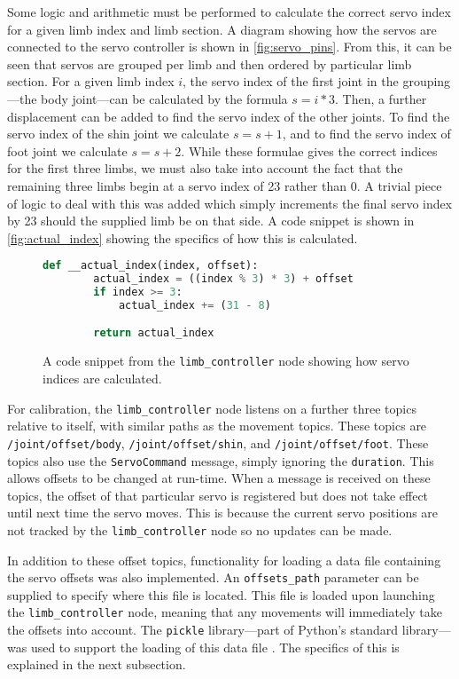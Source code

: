 Some logic and arithmetic must be performed to calculate the correct servo index for a given limb index and limb section. A diagram showing how the servos are connected to the servo controller is shown in \autoref{fig:servo_pins}. From this, it can be seen that servos are grouped per limb and then ordered by particular limb section. For a given limb index $i$, the servo index of the first joint in the grouping---the body joint---can be calculated by the formula $s = i * 3$. Then, a further displacement can be added to find the servo index of the other joints. To find the servo index of the shin joint we calculate $s = s + 1$, and to find the servo index of foot joint we calculate $s = s + 2$. While these formulae gives the correct indices for the first three limbs, we must also take into account the fact that the remaining three limbs begin at a servo index of 23 rather than 0. A trivial piece of logic to deal with this was added which simply increments the final servo index by 23 should the supplied limb be on that side. A code snippet is shown in \autoref{fig:actual_index} showing the specifics of how this is calculated.

\begin{figure}[!h]
    \centering
	\begin{lstlisting}[language=Python]
	def __actual_index(index, offset):
		actual_index = ((index % 3) * 3) + offset
		if index >= 3:
			actual_index += (31 - 8)

		return actual_index
	\end{lstlisting}
	\caption{A code snippet from the \texttt{limb\_controller} node showing how servo indices are calculated.}
	\label{fig:actual_index}
\end{figure}

For calibration, the \texttt{limb\_controller} node listens on a further three topics relative to itself, with similar paths as the movement topics. These topics are \texttt{/joint/offset/body}, \texttt{/joint/offset/shin}, and \texttt{/joint/offset/foot}. These topics also use the \texttt{ServoCommand} message, simply ignoring the \texttt{duration}. This allows offsets to be changed at run-time. When a message is received on these topics, the offset of that particular servo is registered but does not take effect until next time the servo moves. This is because the current servo positions are not tracked by the \texttt{limb\_controller} node so no updates can be made.

In addition to these offset topics, functionality for loading a data file containing the servo offsets was also implemented. An \texttt{offsets\_path} parameter can be supplied to specify where this file is located. This file is loaded upon launching the \texttt{limb\_controller} node, meaning that any movements will immediately take the offsets into account. The \texttt{pickle} library---part of Python's standard library---was used to support the loading of this data file \cite{pickle}. The specifics of this is explained in the next subsection.

